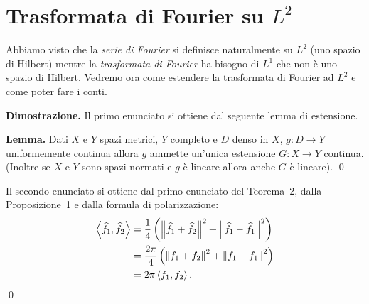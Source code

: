 
\section{Trasformata di Fourier su $L^2$}

Abbiamo visto che la \textit{serie di Fourier} si definisce naturalmente su $L^2$ (uno spazio di Hilbert) mentre la \textit{trasformata di Fourier} ha bisogno di $L^1$ che non è uno spazio di Hilbert. Vedremo ora come estendere la trasformata di Fourier ad $L^2$ e come poter fare i conti.



\textbf{Dimostrazione.} Il primo enunciato si ottiene dal seguente lemma di estensione.

\textbf{Lemma.} Dati $X$ e $Y$ spazi metrici, $Y$ completo e $D$ denso in $X$, $g \colon D \to Y$ uniformemente continua allora $g$ ammette un'unica estensione $G \colon X \to Y$ continua. (Inoltre se $X$ e $Y$ sono spazi normati e $g$ è lineare allora anche $G$ è lineare).
\qed

Il secondo enunciato si ottiene dal primo enunciato del Teorema~2, dalla Proposizione~1 e  dalla formula di polarizzazione:
\begin{align*}
	\left<\widehat{f_1}, \widehat{f_2} \right>
	& =
	\frac{1}{4} \left( \left\lVert \widehat{f_1} + \widehat{f_2} \right\rVert^2 + \left\lVert \widehat{f_1} - \widehat{f_1} \right\rVert^2 \right) \\
	& = \frac{2\pi}{4} \left( \left\lVert f_1 + f_2 \right\rVert^2 + \left\lVert f_1 - f_1 \right\rVert^2 \right) \\
	& = 2\pi \left<f_1,f_2 \right>.
\end{align*}
\qed

